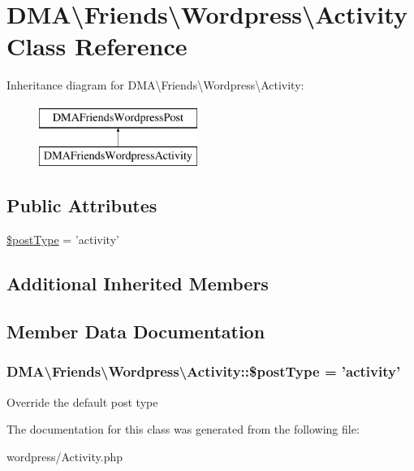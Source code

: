 \hypertarget{classDMA_1_1Friends_1_1Wordpress_1_1Activity}{\section{D\-M\-A\textbackslash{}Friends\textbackslash{}Wordpress\textbackslash{}Activity Class Reference}
\label{classDMA_1_1Friends_1_1Wordpress_1_1Activity}
}
Inheritance diagram for D\-M\-A\textbackslash{}Friends\textbackslash{}Wordpress\textbackslash{}Activity\-:\begin{figure}[H]
\begin{center}
\leavevmode
\includegraphics[height=2.000000cm]{de/d54/classDMA_1_1Friends_1_1Wordpress_1_1Activity}
\end{center}
\end{figure}
\subsection*{Public Attributes}
\begin{DoxyCompactItemize}
\item 
\hyperlink{classDMA_1_1Friends_1_1Wordpress_1_1Activity_a06a7b4fad854f04e2282f92e9829c3d3}{\$post\-Type} = 'activity'
\end{DoxyCompactItemize}
\subsection*{Additional Inherited Members}


\subsection{Member Data Documentation}
\hypertarget{classDMA_1_1Friends_1_1Wordpress_1_1Activity_a06a7b4fad854f04e2282f92e9829c3d3}{
\subsubsection[{\$post\-Type}]{\setlength{\rightskip}{0pt plus 5cm}D\-M\-A\textbackslash{}\-Friends\textbackslash{}\-Wordpress\textbackslash{}\-Activity\-::\$post\-Type = 'activity'}}\label{classDMA_1_1Friends_1_1Wordpress_1_1Activity_a06a7b4fad854f04e2282f92e9829c3d3}
Override the default post type 

The documentation for this class was generated from the following file\-:\begin{DoxyCompactItemize}
\item 
wordpress/Activity.\-php\end{DoxyCompactItemize}
